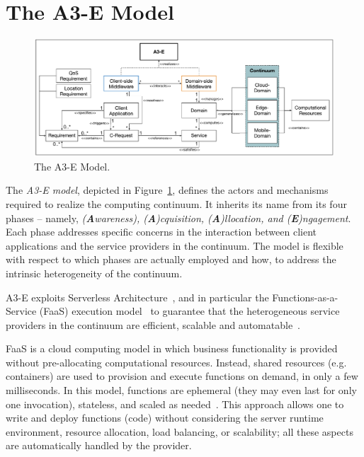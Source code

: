 \section{The A3-E Model}\label{sec:proposal}

\begin{figure}[tbp]
	\includegraphics[width=1\textwidth]{figs/A3-E-model.pdf}
	\caption{The A3-E Model.}
	\label{fig:A3-E-model}
\end{figure}

The \textit{A3-E model}, depicted in Figure~\ref{fig:A3-E-model}, defines the actors and mechanisms required to realize the computing continuum. It inherits its name from its four phases -- namely, \textit{(\textbf{A}wareness), (\textbf{A})cquisition, (\textbf{A})llocation, and (\textbf{E})ngagement}. Each phase addresses specific concerns in the interaction between client applications and the service providers in the continuum. The model is flexible with respect to which phases are actually employed and how, to address the intrinsic heterogeneity of the continuum. 

A3-E exploits Serverless Architecture~\cite{baldini2017serverless}, and in particular the Functions-as-a-Service (FaaS) execution model~\cite{MateosFaaster17} to guarantee that the heterogeneous service providers in the continuum are efficient, scalable and automatable~\cite{GarrigaMendonca2017,Hendrickson:2016}.

FaaS is a cloud computing model in which business functionality is provided without pre-allocating computational resources. Instead, shared resources (e.g. containers) are used to provision and execute functions on demand, in only a few milliseconds. In this model, functions are ephemeral (they may even last for only one invocation), stateless, and scaled as needed~\cite{Roberts:2016}. This approach allows one to write and deploy functions (code) without considering the server runtime environment, resource allocation, load balancing, or scalability; all these aspects are automatically handled by the provider.

